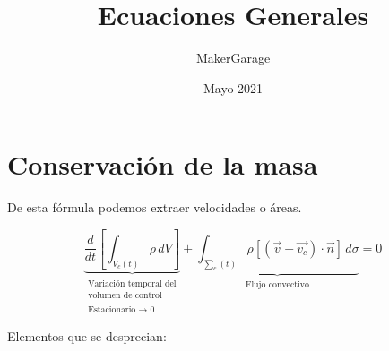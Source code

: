 \documentclass[10pt,a4paper]{article}
\title{Ecuaciones Generales}
\author{MakerGarage}
\date{Mayo 2021}
\begin{document}
\maketitle
\newpage
\tableofcontents
\newpage

\section{Conservación de la masa}
De esta fórmula podemos extraer velocidades o áreas.
\begin{center}
    \begin{tcolorbox}[colback=yellow!40!white, colframe=red!50!black,title=Conservación de la masa]
    $$
        \underbrace{\frac{d}{dt} \left[\int_{V_c(t)}^{} \rho \,dV \right] }_{\substack{\text{Variación temporal del} \\ \text{volumen de control} \\ \text{} \\ \text{Estacionario $\xrightarrow{}$ 0}}} + \underbrace{\int_{\sum_c(t)}^{} \rho \left[\left(\vec{v} - \vec{v_c}\right) \cdot \vec{n} \right] \, d\sigma}_{\substack{{\text {Flujo convectivo}} \\ {}}} = 0
    $$
    \end{tcolorbox}
\end{center}
Elementos que se desprecian:
\end{document}
